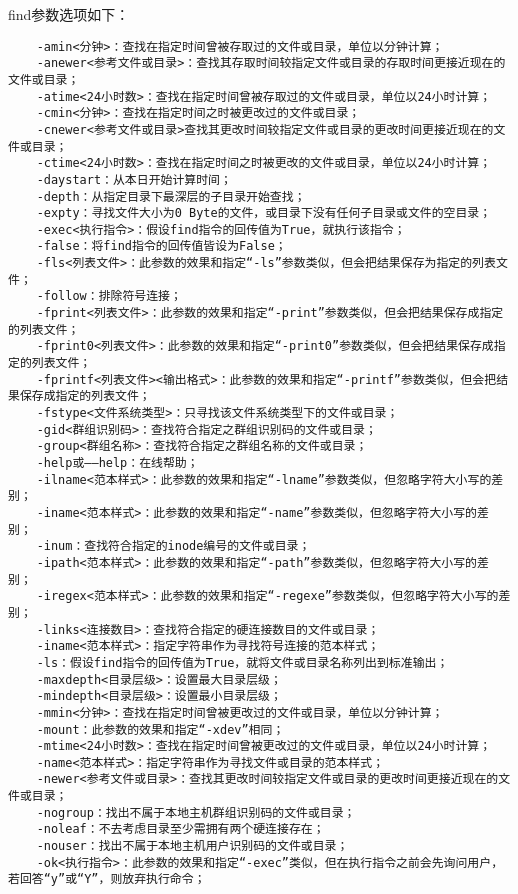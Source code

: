 \documentclass[a4paper,left=2.5cm,right=2.5cm,11pt]{article}
\begin{document}
	find参数选项如下：
	\begin{lstlisting}
	-amin<分钟>：查找在指定时间曾被存取过的文件或目录，单位以分钟计算； 
	-anewer<参考文件或目录>：查找其存取时间较指定文件或目录的存取时间更接近现在的文件或目录； 
	-atime<24小时数>：查找在指定时间曾被存取过的文件或目录，单位以24小时计算； 
	-cmin<分钟>：查找在指定时间之时被更改过的文件或目录； 
	-cnewer<参考文件或目录>查找其更改时间较指定文件或目录的更改时间更接近现在的文件或目录； 
	-ctime<24小时数>：查找在指定时间之时被更改的文件或目录，单位以24小时计算； 
	-daystart：从本日开始计算时间； 
	-depth：从指定目录下最深层的子目录开始查找； 
	-expty：寻找文件大小为0 Byte的文件，或目录下没有任何子目录或文件的空目录； 
	-exec<执行指令>：假设find指令的回传值为True，就执行该指令； 
	-false：将find指令的回传值皆设为False； 
	-fls<列表文件>：此参数的效果和指定“-ls”参数类似，但会把结果保存为指定的列表文件； 
	-follow：排除符号连接； 
	-fprint<列表文件>：此参数的效果和指定“-print”参数类似，但会把结果保存成指定的列表文件； 
	-fprint0<列表文件>：此参数的效果和指定“-print0”参数类似，但会把结果保存成指定的列表文件； 
	-fprintf<列表文件><输出格式>：此参数的效果和指定“-printf”参数类似，但会把结果保存成指定的列表文件； 
	-fstype<文件系统类型>：只寻找该文件系统类型下的文件或目录； 
	-gid<群组识别码>：查找符合指定之群组识别码的文件或目录； 
	-group<群组名称>：查找符合指定之群组名称的文件或目录； 
	-help或——help：在线帮助； 
	-ilname<范本样式>：此参数的效果和指定“-lname”参数类似，但忽略字符大小写的差别； 
	-iname<范本样式>：此参数的效果和指定“-name”参数类似，但忽略字符大小写的差别； 
	-inum：查找符合指定的inode编号的文件或目录； 
	-ipath<范本样式>：此参数的效果和指定“-path”参数类似，但忽略字符大小写的差别； 
	-iregex<范本样式>：此参数的效果和指定“-regexe”参数类似，但忽略字符大小写的差别； 
	-links<连接数目>：查找符合指定的硬连接数目的文件或目录； 
	-iname<范本样式>：指定字符串作为寻找符号连接的范本样式； 
	-ls：假设find指令的回传值为True，就将文件或目录名称列出到标准输出； 
	-maxdepth<目录层级>：设置最大目录层级； 
	-mindepth<目录层级>：设置最小目录层级； 
	-mmin<分钟>：查找在指定时间曾被更改过的文件或目录，单位以分钟计算； 
	-mount：此参数的效果和指定“-xdev”相同； 
	-mtime<24小时数>：查找在指定时间曾被更改过的文件或目录，单位以24小时计算； 
	-name<范本样式>：指定字符串作为寻找文件或目录的范本样式； 
	-newer<参考文件或目录>：查找其更改时间较指定文件或目录的更改时间更接近现在的文件或目录； 
	-nogroup：找出不属于本地主机群组识别码的文件或目录； 
	-noleaf：不去考虑目录至少需拥有两个硬连接存在； 
	-nouser：找出不属于本地主机用户识别码的文件或目录； 
	-ok<执行指令>：此参数的效果和指定“-exec”类似，但在执行指令之前会先询问用户，若回答“y”或“Y”，则放弃执行命令； 

\end{lstlisting}
\end{document}
